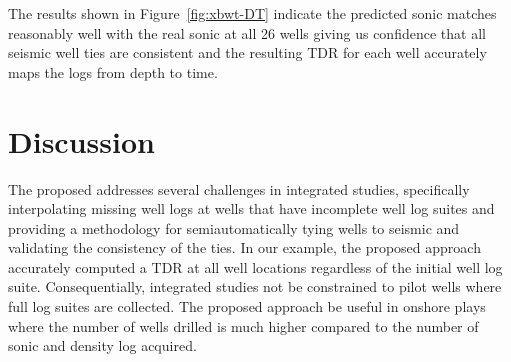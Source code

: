 
The results shown in Figure~\ref{fig:xbwt-DT} indicate the predicted sonic matches reasonably well with the real sonic at all 26 wells giving us confidence that all seismic well ties are consistent and the resulting TDR for each well accurately maps the logs from depth to time.

\section{Discussion}
The proposed  addresses several challenges in integrated studies, specifically  interpolating missing well logs at wells that have incomplete well log suites and  providing a methodology for semiautomatically tying wells to seismic and validating the consistency of the ties. In our example, the proposed approach accurately computed a TDR at all well locations regardless of the  initial well log suite. Consequentially, integrated studies  not be constrained to pilot wells where full log suites are collected. The proposed approach  be  useful in onshore plays where the number of wells drilled is much higher compared to the number of sonic and density log acquired.

